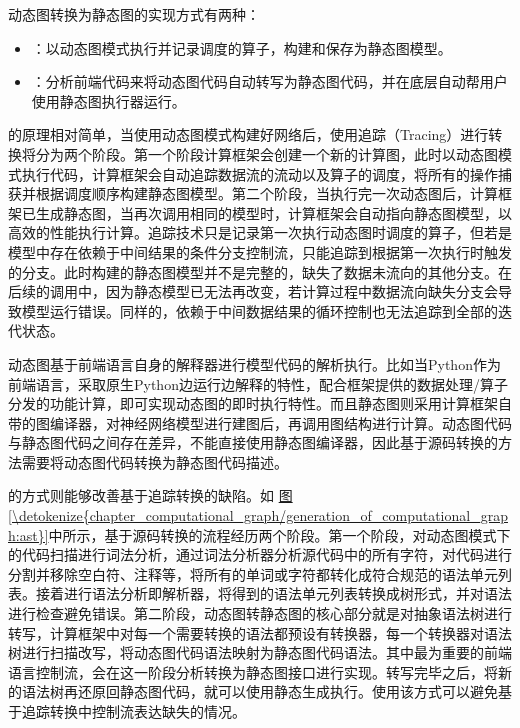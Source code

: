 \documentclass[letterpaper,10pt,english]{sphinxmanual}
\begin{document}
\sphinxAtStartPar
动态图转换为静态图的实现方式有两种：
\begin{itemize}
\item {} 
\sphinxAtStartPar
{}：以动态图模式执行并记录调度的算子，构建和保存为静态图模型。

\item {} 
\sphinxAtStartPar
{}：分析前端代码来将动态图代码自动转写为静态图代码，并在底层自动帮用户使用静态图执行器运行。

\end{itemize}

\sphinxAtStartPar
{}的原理相对简单，当使用动态图模式构建好网络后，使用追踪（Tracing）进行转换将分为两个阶段。第一个阶段计算框架会创建一个新的计算图，此时以动态图模式执行代码，计算框架会自动追踪数据流的流动以及算子的调度，将所有的操作捕获并根据调度顺序构建静态图模型。第二个阶段，当执行完一次动态图后，计算框架已生成静态图，当再次调用相同的模型时，计算框架会自动指向静态图模型，以高效的性能执行计算。追踪技术只是记录第一次执行动态图时调度的算子，但若是模型中存在依赖于中间结果的条件分支控制流，只能追踪到根据第一次执行时触发的分支。此时构建的静态图模型并不是完整的，缺失了数据未流向的其他分支。在后续的调用中，因为静态模型已无法再改变，若计算过程中数据流向缺失分支会导致模型运行错误。同样的，依赖于中间数据结果的循环控制也无法追踪到全部的迭代状态。

\sphinxAtStartPar
动态图基于前端语言自身的解释器进行模型代码的解析执行。比如当Python作为前端语言，采取原生Python边运行边解释的特性，配合框架提供的数据处理/算子分发的功能计算，即可实现动态图的即时执行特性。而且静态图则采用计算框架自带的图编译器，对神经网络模型进行建图后，再调用图结构进行计算。动态图代码与静态图代码之间存在差异，不能直接使用静态图编译器，因此基于源码转换的方法需要将动态图代码转换为静态图代码描述。

\sphinxAtStartPar
{}的方式则能够改善基于追踪转换的缺陷。如
\hyperref[\detokenize{chapter_computational_graph/generation_of_computational_graph:ast}]{图\ref{\detokenize{chapter_computational_graph/generation_of_computational_graph:ast}}}中所示，基于源码转换的流程经历两个阶段。第一个阶段，对动态图模式下的代码扫描进行词法分析，通过词法分析器分析源代码中的所有字符，对代码进行分割并移除空白符、注释等，将所有的单词或字符都转化成符合规范的语法单元列表。接着进行语法分析即解析器，将得到的语法单元列表转换成树形式，并对语法进行检查避免错误。第二阶段，动态图转静态图的核心部分就是对抽象语法树进行转写，计算框架中对每一个需要转换的语法都预设有转换器，每一个转换器对语法树进行扫描改写，将动态图代码语法映射为静态图代码语法。其中最为重要的前端语言控制流，会在这一阶段分析转换为静态图接口进行实现。转写完毕之后，将新的语法树再还原回静态图代码，就可以使用静态生成执行。使用该方式可以避免基于追踪转换中控制流表达缺失的情况。
\end{document}

